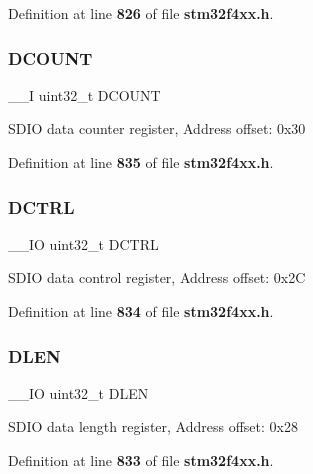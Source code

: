 Definition at line \textbf{ 826} of file \textbf{ stm32f4xx.\+h}.

\mbox{\label{structSDIO__TypeDef_a4273e2b5aeb7bdf1006909b1a2b59bc8}} 
\subsubsection{D\+C\+O\+U\+NT}
{\footnotesize\ttfamily \+\_\+\+\_\+I uint32\+\_\+t D\+C\+O\+U\+NT}

S\+D\+IO data counter register, Address offset\+: 0x30 

Definition at line \textbf{ 835} of file \textbf{ stm32f4xx.\+h}.

\mbox{\label{structSDIO__TypeDef_a96a3d1a050982fccc23c2e6dbe0de068}} 
\subsubsection{D\+C\+T\+RL}
{\footnotesize\ttfamily \+\_\+\+\_\+\+IO uint32\+\_\+t D\+C\+T\+RL}

S\+D\+IO data control register, Address offset\+: 0x2C 

Definition at line \textbf{ 834} of file \textbf{ stm32f4xx.\+h}.

\mbox{\label{structSDIO__TypeDef_a612edc78d2fa6288392f8ea32c36f7fb}} 
\subsubsection{D\+L\+EN}
{\footnotesize\ttfamily \+\_\+\+\_\+\+IO uint32\+\_\+t D\+L\+EN}

S\+D\+IO data length register, Address offset\+: 0x28 

Definition at line \textbf{ 833} of file \textbf{ stm32f4xx.\+h}.

\mbox{\label{structSDIO__TypeDef_a1dd219eaeee8d9def822da843028bd02}} 
